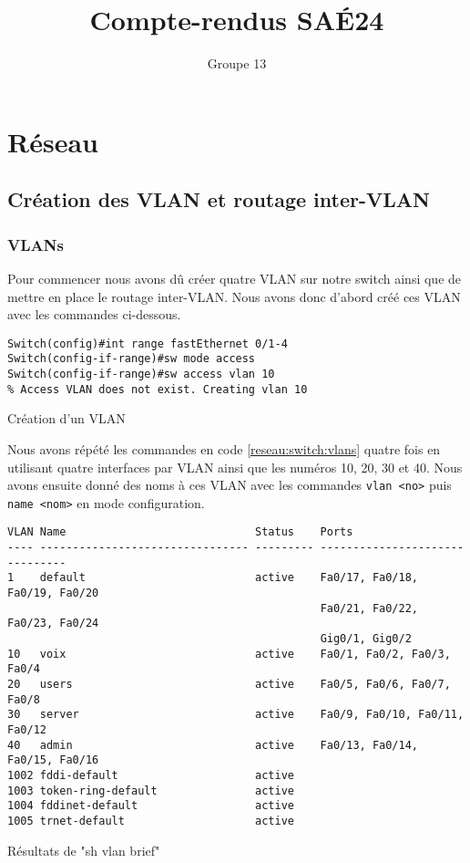 \documentclass{article}
\author{Groupe 13}
\title{Compte-rendus SAÉ24}
\begin{document}
\maketitle
\tableofcontents
\newpage
\listoffigures
\newpage
\listoflistings

\newpage
\section{Réseau}
\subsection{Création des VLAN et routage inter-VLAN}
\subsubsection{VLANs}
Pour commencer nous avons dû créer quatre VLAN sur notre switch ainsi que de mettre en place le routage inter-VLAN. 
Nous avons donc d'abord créé ces VLAN avec les commandes ci-dessous.
\begin{listing}[H]
    \begin{verbatim}
Switch(config)#int range fastEthernet 0/1-4
Switch(config-if-range)#sw mode access 
Switch(config-if-range)#sw access vlan 10
% Access VLAN does not exist. Creating vlan 10
    \end{verbatim}
    \caption{Création d'un VLAN}
    \label{reseau:switch:vlans}
\end{listing}
Nous avons répété les commandes en code \ref{reseau:switch:vlans} quatre fois en utilisant quatre interfaces par VLAN ainsi que les numéros 10, 20, 30 et 40. 
Nous avons ensuite donné des noms à ces VLAN avec les commandes \verb|vlan <no>| puis \verb|name <nom>| en mode configuration.

\begin{listing}[H]
    \begin{verbatim}
VLAN Name                             Status    Ports
---- -------------------------------- --------- -------------------------------
1    default                          active    Fa0/17, Fa0/18, Fa0/19, Fa0/20
                                                Fa0/21, Fa0/22, Fa0/23, Fa0/24
                                                Gig0/1, Gig0/2
10   voix                             active    Fa0/1, Fa0/2, Fa0/3, Fa0/4
20   users                            active    Fa0/5, Fa0/6, Fa0/7, Fa0/8
30   server                           active    Fa0/9, Fa0/10, Fa0/11, Fa0/12
40   admin                            active    Fa0/13, Fa0/14, Fa0/15, Fa0/16
1002 fddi-default                     active    
1003 token-ring-default               active    
1004 fddinet-default                  active    
1005 trnet-default                    active    
    \end{verbatim}
    \caption{Résultats de "sh vlan brief"}
    \label{reseau:switch:sh-vlan}
\end{listing}
\end{document}
